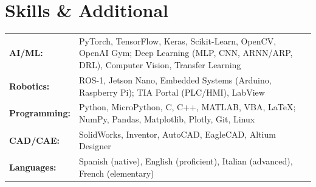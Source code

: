 \documentclass[11pt,letterpaper]{article}
\begin{document}
\section{Skills \& Additional}

\begin{tabularx}{\textwidth}{@{}p{1.3in} X@{}}
\textbf{AI/ML:} & PyTorch, TensorFlow, Keras, Scikit-Learn, OpenCV, OpenAI Gym; Deep Learning (MLP, CNN, ARNN/ARP, DRL), Computer Vision, Transfer Learning \\[2pt]
\textbf{Robotics:} & ROS-1, Jetson Nano, Embedded Systems (Arduino, Raspberry Pi); TIA Portal (PLC/HMI), LabView \\[2pt]
\textbf{Programming:} & Python, MicroPython, C, C++, MATLAB, VBA, \LaTeX{}; NumPy, Pandas, Matplotlib, Plotly, Git, Linux \\[2pt]
\textbf{CAD/CAE:} & SolidWorks, Inventor, AutoCAD, EagleCAD, Altium Designer \\[2pt]
\textbf{Languages:} & Spanish (native), English (proficient), Italian (advanced), French (elementary) \\
\end{tabularx}
\end{document}

